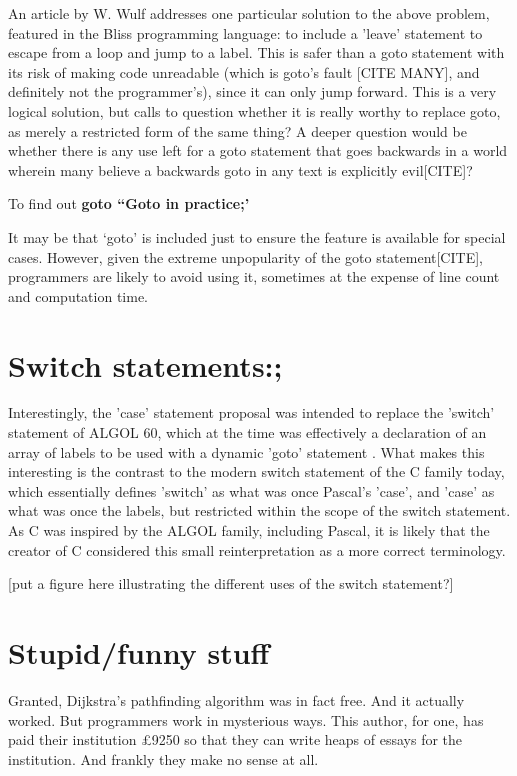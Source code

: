 \documentclass{journal}
\begin{document}
An article by W. Wulf \cite{againstgoto} addresses one particular solution to the above problem, featured in the Bliss programming language: to include a 'leave' statement to escape from a loop and jump to a label. This is safer than a goto statement with its risk of making code unreadable (which is goto's fault [CITE MANY], and definitely not the programmer's), since it can only jump forward. This is a very logical solution, but calls to question whether it is really worthy to replace goto, as merely a restricted form of the same thing? A deeper question would be whether there is any use left for a goto statement that goes backwards in a world wherein many believe a backwards goto in any text is explicitly evil[CITE]?

To find out \textbf{goto ``Goto in practice;'}


It may be that `goto' is included just to ensure the feature is available for special cases. However, given the extreme unpopularity of the goto statement[CITE], programmers are likely to avoid using it, sometimes at the expense of line count and computation time.

\section{Switch statements:;}
Interestingly, the 'case' statement proposal was intended to replace the 'switch' statement of ALGOL 60, which at the time was effectively a declaration of an array of labels to be used with a dynamic 'goto' statement \cite{algolguide}. What makes this interesting is the contrast to the modern switch statement of the C family today, which essentially defines 'switch' as what was once Pascal's 'case', and 'case' as what was once the labels, but restricted within the scope of the switch statement. As C was inspired by the ALGOL family, including Pascal, it is likely that the creator of C considered this small reinterpretation as a more correct terminology.

[put a figure here illustrating the different uses of the switch statement?]

\section{Stupid/funny stuff}
Granted, Dijkstra's pathfinding algorithm was in fact free. And it actually worked. But programmers work in mysterious ways. This author, for one, has paid their institution £9250 so that they can write heaps of essays for the institution. And frankly they make no sense at all.
\end{document}
